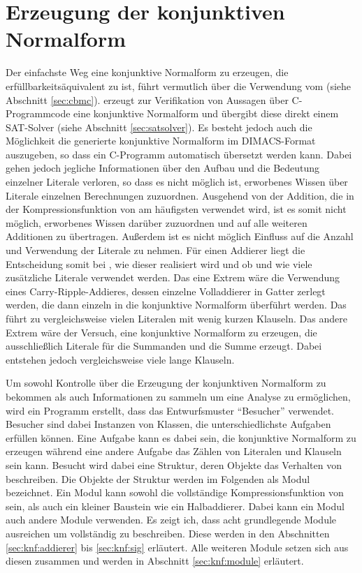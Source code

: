 \chapter{Erzeugung der konjunktiven Normalform}
\label{chp:knf}

Der einfachste Weg eine konjunktive Normalform zu erzeugen, die erfüllbarkeitsäquivalent zu  ist, führt vermutlich über die Verwendung vom 
(siehe Abschnitt \ref{sec:cbmc}).  erzeugt zur Verifikation von Aussagen über C-Programmcode eine konjunktive Normalform und übergibt diese direkt
einem SAT-Solver (siehe Abschnitt \ref{sec:satsolver}). Es besteht jedoch auch die Möglichkeit die generierte konjunktive Normalform im DIMACS-Format auszugeben,
so dass ein C-Programm automatisch übersetzt werden kann. Dabei gehen jedoch jegliche Informationen über den Aufbau und die Bedeutung einzelner Literale verloren,
so dass es nicht möglich ist, erworbenes Wissen über Literale einzelnen Berechnungen zuzuordnen. Ausgehend von der Addition, die in der Kompressionsfunktion von
 am häufigsten verwendet wird, ist es somit nicht möglich, erworbenes Wissen darüber zuzuordnen und auf alle weiteren Additionen zu übertragen.
Außerdem ist es nicht möglich Einfluss auf die Anzahl und Verwendung der Literale zu nehmen. Für einen Addierer liegt die Entscheidung somit bei ,
wie dieser realisiert wird und ob und wie viele zusätzliche Literale verwendet werden. Das eine Extrem wäre die Verwendung eines Carry-Ripple-Addieres, dessen einzelne
Volladdierer in Gatter zerlegt werden, die dann einzeln in die konjunktive Normalform überführt werden. Das führt zu vergleichsweise vielen Literalen mit wenig
kurzen Klauseln. Das andere Extrem wäre der Versuch, eine konjunktive Normalform zu erzeugen, die ausschließlich Literale für die Summanden und die Summe erzeugt.
Dabei entstehen jedoch vergleichsweise viele lange Klauseln.

Um sowohl Kontrolle über die Erzeugung der konjunktiven Normalform zu bekommen als auch Informationen zu sammeln um eine Analyse zu ermöglichen, wird ein Programm
erstellt, dass das Entwurfsmuster "`Besucher"' \cite[301]{visitor} verwendet. Besucher sind dabei Instanzen von Klassen, die unterschiedlichste Aufgaben erfüllen können.
Eine Aufgabe kann es dabei sein, die konjunktive Normalform zu erzeugen während eine andere Aufgabe das Zählen von Literalen und Klauseln sein kann.
Besucht wird dabei eine Struktur, deren Objekte das Verhalten von  beschreiben. Die Objekte der Struktur werden im Folgenden als Modul bezeichnet.
Ein Modul kann sowohl die vollständige Kompressionsfunktion von  sein, als auch ein kleiner Baustein wie ein Halbaddierer. Dabei kann ein Modul
auch andere Module verwenden. Es zeigt ich, dass acht grundlegende Module ausreichen um  vollständig zu beschreiben. Diese werden in den Abschnitten
\ref{sec:knf:addierer} bis \ref{sec:knf:sig} erläutert. Alle weiteren Module setzen sich aus diesen zusammen und werden in Abschnitt \ref{sec:knf:module} erläutert.

